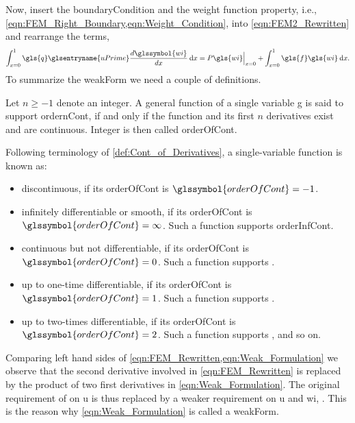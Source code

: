 Now, insert the \gls{boundaryCondition} and the weight function property, i.e., \cref{eqn:FEM_Right_Boundary,eqn:Weight_Condition},
into \cref{eqn:FEM2_Rewritten} and rearrange the terms,
\begin{equation} \label{eqn:Weak_Formulation}
	\int_{x = 0}^{1} \gls{q} \glsentryname{uPrime} \frac{ d \glssymbol{wi} }{dx} \dd x = P  \gls{wi} \Big \vert_{x = 0} + \int_{x = 0}^{1} \gls{f} \gls{wi} \dd x.
\end{equation}
%
To summarize the \gls{weakForm} we need a couple of definitions. \\
\begin{definition} \label{def:Cont_of_Derivatives}
	Let $n \geq -1$ denote an integer. A general function of a single variable \gls{g} is said to support \gls{ordernCont},
	if and only if the function and its first $n$ derivatives exist and are continuous.
	Integer  is then called \gls{orderOfCont}.
\end{definition}
Following terminology of \cref{def:Cont_of_Derivatives}, a single-variable function is known as:
\begin{itemize}
	\item discontinuous, if its \gls{orderOfCont} is $\glssymbol{orderOfCont} = -1$.
	\item infinitely differentiable or smooth, if its \gls{orderOfCont} is $\glssymbol{orderOfCont} = \infty$.
		Such a function supports \gls{orderInfCont}.
	\item continuous but not differentiable, if its \gls{orderOfCont} is $\glssymbol{orderOfCont} = 0$.
		Such a function supports .
	\item up to one-time differentiable, if its \gls{orderOfCont} is $\glssymbol{orderOfCont} = 1$.
		Such a function supports .
	\item up to two-times differentiable, if its \gls{orderOfCont} is $\glssymbol{orderOfCont} = 2$.
		Such a function supports , and so on.
\end{itemize}
%
\begin{remark}
	Comparing left hand sides of \cref{eqn:FEM_Rewritten,eqn:Weak_Formulation} we observe that the second derivative involved in
	\cref{eqn:FEM_Rewritten} is replaced by the product of two first derivatives in \cref{eqn:Weak_Formulation}. The original
	requirement of  on \gls{u} is thus replaced by a weaker requirement on \gls{u} and \gls{wi},
	. This is the reason why \cref{eqn:Weak_Formulation} is called a \gls{weakForm}.
\end{remark}
